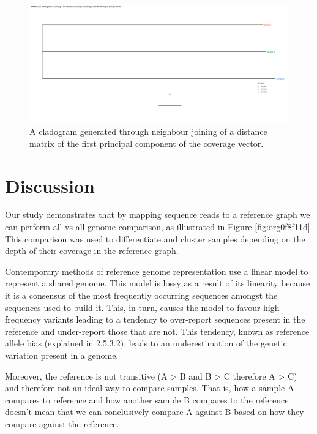 \documentclass[10pt, a4paper]{article}
\begin{document}
\begin{landscape}
\begin{figure}
\centering
\includegraphics[width=1.0\textwidth]{../Figures/SARS_CoV_2/SARS_CoV_2_all_principal_components_nj_tree.png}
\caption[SARS-CoV-2 PC1 to PC5 cladogram]{\label{fig:orgf79d508}A cladogram generated through neighbour joining  of a distance matrix of the first principal component of the coverage vector.}
\end{figure}
\end{landscape}
\newpage
\section{Discussion}
\label{sec:org015657b}
Our study demonstrates that by mapping sequence reads to a reference
graph we can perform all vs all genome comparison, as illustrated in 
Figure \ref{fig:org0f8f11d}.
This comparison was used to differentiate and cluster samples depending on the
depth of their coverage in the reference graph.


Contemporary methods of reference genome representation use a linear model to
represent a shared genome. This model is lossy as a result of its linearity
because it is a consensus of the most frequently occurring sequences amongst 
the sequences used to build it. This, in turn, causes the model to favour 
high-frequency variants leading to a tendency to over-report sequences present 
in the reference and under-report those that are not. This tendency, known as
reference allele bias (explained in 2.5.3.2), leads to an underestimation of 
the genetic variation present in a genome. 

Moreover, the reference is not transitive  (A > B and B > C therefore A > C) 
and therefore not an ideal way to compare samples.
That is, how a sample A compares to reference and how another sample B compares
to the reference doesn't mean that we can conclusively compare A against B based
on how they compare against the reference.
\end{document}
